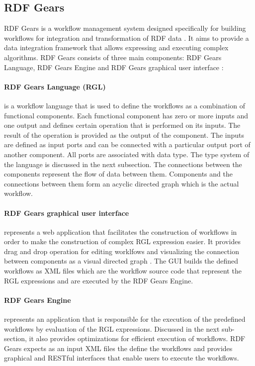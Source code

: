 \subsection{RDF Gears}

RDF Gears is a workflow management system designed specifically for building workflows for integration and transformation of RDF data \cite{feliksik2011}. It aims to provide a data integration framework that allows expressing and executing complex algorithms. RDF Gears consists of three main components: RDF Gears Language, RDF Gears Engine and RDF Gears graphical user interface \cite{feliksik2011}:

\paragraph{RDF Gears Language (RGL)} is a workflow language that is used to define the workflows as a combination of functional components. Each functional component has zero or more inputs and one output and defines certain operation that is performed on its inputs. The result of the operation is provided as the output of the component. The inputs are defined as input ports and can be connected with a particular output port of another component. All ports are associated with data type. The type system of the language is discussed in the next subsection. The connections between the components represent the flow of data between them. Components and the connections between them form an acyclic directed graph which is the actual workflow. 

\paragraph{RDF Gears graphical user interface} represents a web application that facilitates the construction of workflows in order to make the construction of complex RGL expression easier. It provides drag and drop operation for editing worklfows and visualizing the connection between components as a visual directed graph \cite{maro2011}. The GUI builds the defined workflows as XML files which are the workflow source code that represent the RGL expressions and are executed by the RDF Gears Engine.

\paragraph{RDF Gears Engine} represents an application that is responsible for the execution of the predefined workflows by evaluation of the RGL expressions. Discussed in the next sub-section, it also provides optimizations for efficient execution of workflows. RDF Gears expects as an input XML files the define the workflows and provides graphical and RESTful interfaces that enable users to execute the workflows. 

